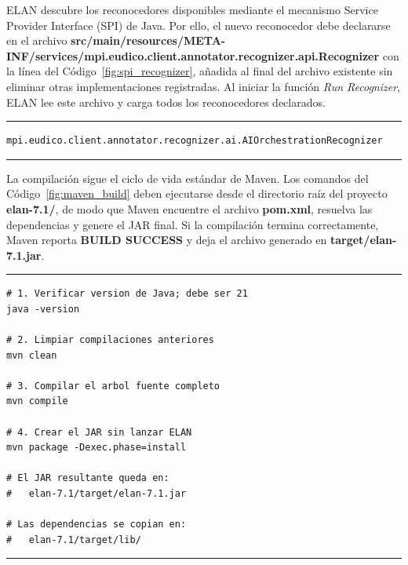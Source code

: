 ELAN descubre los reconocedores disponibles mediante el mecanismo Service Provider Interface (SPI) de Java. Por ello, el nuevo reconocedor debe declararse en el archivo \textbf{src/main/resources/META-INF/services/mpi.eudico.client.annotator.recognizer.api.Recognizer} con la línea del Código~\ref{fig:spi_recognizer}, añadida al final del archivo existente sin eliminar otras implementaciones registradas. Al iniciar la función \textit{Run Recognizer}, ELAN lee este archivo y carga todos los reconocedores declarados.

\begin{center}
\begin{minipage}{0.92\textwidth}
\hrule
\vspace{0.06cm}
\scriptsize
\begin{Verbatim}[baselinestretch=0.72]
mpi.eudico.client.annotator.recognizer.ai.AIOrchestrationRecognizer
\end{Verbatim}
\vspace{0.03cm}
\hrule

\label{fig:spi_recognizer}
\end{minipage}
\end{center}

La compilación sigue el ciclo de vida estándar de Maven. Los comandos del Código~\ref{fig:maven_build} deben ejecutarse desde el directorio raíz del proyecto \textbf{elan-7.1/}, de modo que Maven encuentre el archivo \textbf{pom.xml}, resuelva las dependencias y genere el JAR final. Si la compilación termina correctamente, Maven reporta \textbf{BUILD SUCCESS} y deja el archivo generado en \textbf{target/elan-7.1.jar}.

\begin{center}
\begin{minipage}{0.88\textwidth}
\hrule
\vspace{0.06cm}
\scriptsize
\begin{Verbatim}[baselinestretch=0.72]
# 1. Verificar version de Java; debe ser 21
java -version

# 2. Limpiar compilaciones anteriores
mvn clean

# 3. Compilar el arbol fuente completo
mvn compile

# 4. Crear el JAR sin lanzar ELAN
mvn package -Dexec.phase=install

# El JAR resultante queda en:
#   elan-7.1/target/elan-7.1.jar

# Las dependencias se copian en:
#   elan-7.1/target/lib/
\end{Verbatim}
\vspace{0.03cm}
\hrule

\label{fig:maven_build}
\end{minipage}
\end{center}

